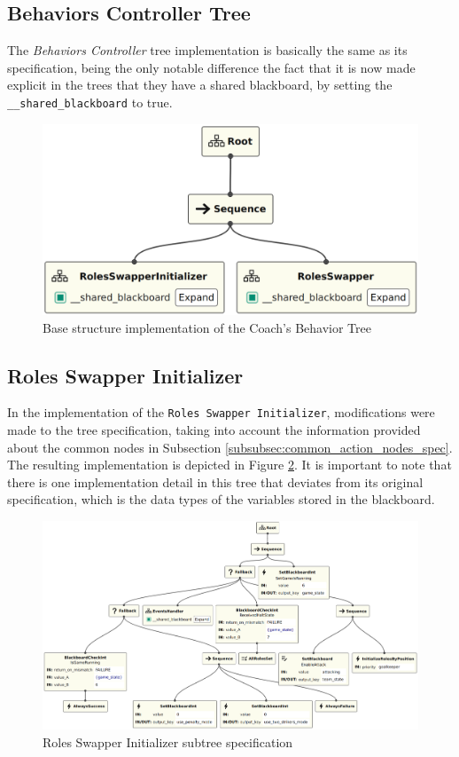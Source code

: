 \subsection{Behaviors Controller Tree}

The \textit{Behaviors Controller} tree implementation is basically the same as its specification, being the only notable difference the fact that it is now made explicit in the trees that they have a shared blackboard, by setting the \texttt{\_\_shared\_blackboard} to true.

\begin{figure}[!h]
    \centering
    \includegraphics[width=0.7\linewidth]{chapters/development/images/BehaviorsController.png}
    \caption{Base structure implementation of the Coach’s Behavior Tree}
    \label{fig:behaviors_controller_bt_impl}
\end{figure}

\subsection{Roles Swapper Initializer}

In the implementation of the \texttt{Roles Swapper Initializer}, modifications were made to the tree specification, taking into account the information provided about the common nodes in Subsection \ref{subsubsec:common_action_nodes_spec}. The resulting implementation is depicted in Figure \ref{fig:roles_swapper_initializer_impl}. It is important to note that there is one implementation detail in this tree that deviates from its original specification, which is the data types of the variables stored in the blackboard.

\begin{figure}[!h]
    \centering
    \includegraphics[width=1.0\linewidth]{chapters/development/images/RolesSwapperInitializer.png}
    \caption{Roles Swapper Initializer subtree specification}
    \label{fig:roles_swapper_initializer_impl}
\end{figure}

